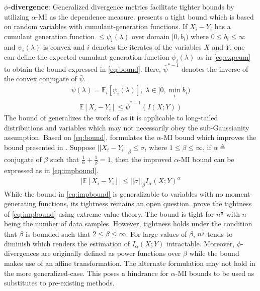 \documentclass{article}
\begin{document}
\textbf{$\phi$-divergence}: Generalized divergence metrics facilitate tighter bounds by utilizing $\alpha$-MI as the dependence measure. \cite{control} presents a tight bound which is based on random variables with cumulant-generation functions. If $X_{i}-Y_{i}$ has a cumulant generation function $\leq \psi_{i}(\lambda)$ over domain $[0,b_{i})$ where $0 \leq b_{i} \leq \infty$ and $\psi_{i}(\lambda)$ is convex and $i$ denotes the iterates of the variables $X$ and $Y$, one can define the expected cumulant-generation function $\bar{\psi_{i}}(\lambda)$ as in \autoref{eq:expcum} to obtain the bound expressed in \autoref{eq:bound}. Here, $\bar{\psi}^{*-1}$ denotes the inverse of the convex conjugate of $\bar{\psi}$. 
\begin{gather}
  \bar{\psi}(\lambda) = \mathbb{E}_{i}[\psi_{i}(\lambda)],\; \lambda \in [0,\underset{i}{\min} b_{i}) \label{eq:expcum}
\end{gather}
\begin{gather}
  \mathbb{E}[X_{i} - Y_{i}] \leq \bar{\psi}^{*-1}(I(X;Y)) \label{eq:bound}
\end{gather} 
The bound of \cite{control} generalizes the work of \cite{russo} as it is applicable to long-tailed distributions and variables which may not necessarily obey the sub-Gaussianity assumption. Based on \autoref{eq:bound}, \cite{control} formulates the $\alpha$-MI bound which improves the bound presented in \cite{russo}. Suppose $||X_{i} - Y_{i}||_{\beta} \leq \sigma_{i}$ where $1 \leq \beta \leq \infty$, if $\alpha \triangleq$ conjugate of $\beta$ such that $\frac{1}{\alpha} + \frac{1}{\beta} = 1$, then the improved $\alpha$-MI bound can be expressed as in \autoref{eq:impbound}. 
\begin{gather}
  |\mathbb{E}[X_{i} - Y_{i}]| \leq ||\sigma||_{\beta}I_{\alpha}(X;Y)^{\alpha} \label{eq:impbound}
\end{gather}
While the bound in \autoref{eq:impbound} is generalizable to variables with no moment-generating functions, its tightness remains an open question. \cite{control} prove the tightness of \autoref{eq:impbound} using extreme value theory. The bound is tight for $n^{\frac{1}{\beta}}$ with $n$ being the number of data samples. However, tightness holds under the condition that $\beta$ is bounded such that $2 \leq \beta \leq \infty$. For large values of $\beta$, $n^{\frac{1}{\beta}}$ tends to diminish which renders the estimation of $I_{\alpha}(X;Y)$ intractable. Moreover, $\phi$-divergences are originally defined as power functions over $\beta$ while the bound makes use of an affine transformation. The alternate formulation may not hold in the more generalized-case. This poses a hindrance for $\alpha$-MI bounds to be used as substitutes to pre-existing methods. 
\end{document}
